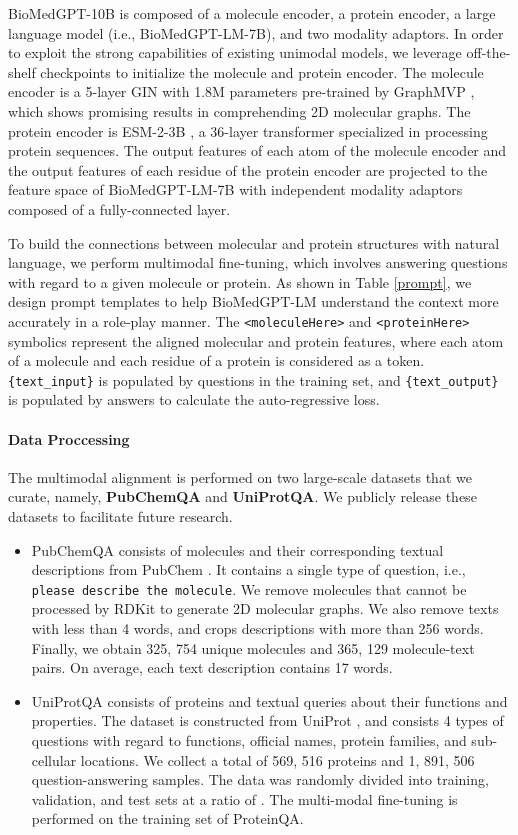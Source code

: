 \documentclass{article}
\begin{document}
\label{mma}
BioMedGPT-10B is composed of a molecule encoder, a protein encoder, a large language model (i.e., BioMedGPT-LM-7B), and two modality adaptors. In order to exploit the strong capabilities of existing unimodal models, we leverage off-the-shelf checkpoints to initialize the molecule and protein encoder. The molecule encoder is a 5-layer GIN \citep{Xu2018HowPA} with 1.8M parameters pre-trained by GraphMVP \citep{GraphMVP}, which shows promising results in comprehending 2D molecular graphs. The protein encoder is ESM-2-3B \citep{ESM2}, a 36-layer transformer \citep{vaswani2023attention} specialized in processing protein sequences. The output features of each atom of the molecule encoder and the output features of each residue of the protein encoder are projected to the feature space of BioMedGPT-LM-7B with independent modality adaptors composed of a fully-connected layer.

To build the connections between molecular and protein structures with natural language, we perform multimodal fine-tuning, which involves answering questions with regard to a given molecule or protein. As shown in Table \ref{prompt}, we design prompt templates to help BioMedGPT-LM understand the context more accurately in a role-play manner. The \texttt{<moleculeHere>} and \texttt{<proteinHere>} symbolics represent the aligned molecular and protein features, where each atom of a molecule and each residue of a protein is considered as a token. \texttt{\{text\_input\}} is populated by questions in the training set, and \texttt{\{text\_output\}} is populated by answers to calculate the auto-regressive loss. 

\paragraph{Data Proccessing} 
\label{Alignment data}
The multimodal alignment is performed on two large-scale datasets that we curate, namely, \textbf{PubChemQA} and \textbf{UniProtQA}. We publicly release these datasets to facilitate future research.
\begin{itemize}
    \item PubChemQA consists of molecules and their corresponding textual descriptions from PubChem \citep{PubChem}. It contains a single type of question, i.e., \texttt{please describe the molecule}. We remove molecules that cannot be processed by RDKit \citep{rdkit} to generate 2D molecular graphs. We also remove texts with less than 4 words, and crops descriptions with more than 256 words. Finally, we obtain 325, 754 unique molecules and 365, 129 molecule-text pairs. On average, each text description contains 17 words.
    \item UniProtQA consists of proteins and textual queries about their functions and properties. The dataset is constructed from UniProt \citep{UniProt}, and consists 4 types of questions with regard to functions, official names, protein families, and sub-cellular locations. We collect a total of 569, 516 proteins and 1, 891, 506 question-answering samples. The data was randomly divided into training, validation, and test sets at a ratio of . The multi-modal fine-tuning is performed on the training set of ProteinQA.
\end{itemize}
\end{document}
